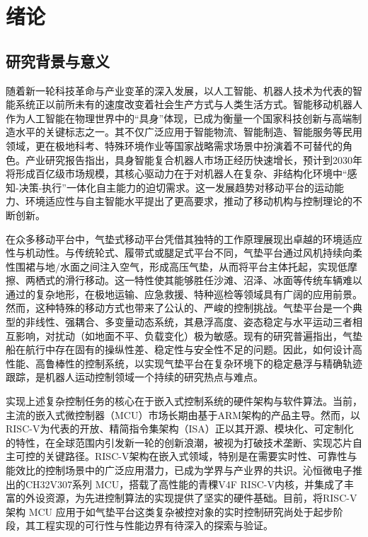 \section{绪论}

\subsection{研究背景与意义}

随着新一轮科技革命与产业变革的深入发展，以人工智能、机器人技术为代表的智能系统正以前所未有的速度改变着社会生产方式与人类生活方式。智能移动机器人作为人工智能在物理世界中的“具身”体现，已成为衡量一个国家科技创新与高端制造水平的关键标志之一。其不仅广泛应用于智能物流、智能制造、智能服务等民用领域，更在极地科考、特殊环境作业等国家战略需求场景中扮演着不可替代的角色。产业研究报告指出，具身智能复合机器人市场正经历快速增长，预计到2030年将形成百亿级市场规模，其核心驱动力在于对机器人在复杂、非结构化环境中“感知-决策-执行”一体化自主能力的迫切需求\cite{ref1}。这一发展趋势对移动平台的运动能力、环境适应性与自主智能水平提出了更高要求，推动了移动机构与控制理论的不断创新。

在众多移动平台中，气垫式移动平台凭借其独特的工作原理展现出卓越的环境适应性与机动性。与传统轮式、履带式或腿足式平台不同，气垫平台通过风机持续向柔性围裙与地/水面之间注入空气，形成高压气垫，从而将平台主体托起，实现低摩擦、两栖式的滑行移动。这一特性使其能够胜任沙滩、沼泽、冰面等传统车辆难以通过的复杂地形，在极地运输、应急救援、特种巡检等领域具有广阔的应用前景。然而，这种特殊的移动方式也带来了公认的、严峻的控制挑战。气垫平台是一个典型的非线性、强耦合、多变量动态系统，其悬浮高度、姿态稳定与水平运动三者相互影响，对扰动（如地面不平、负载变化）极为敏感。现有的研究普遍指出，气垫船在航行中存在固有的操纵性差、稳定性与安全性不足的问题。因此，如何设计高性能、高鲁棒性的控制系统，以实现气垫平台在复杂环境下的稳定悬浮与精确轨迹跟踪，是机器人运动控制领域一个持续的研究热点与难点\cite{ref2}。

实现上述复杂控制任务的核心在于嵌入式控制系统的硬件架构与软件算法。当前，主流的嵌入式微控制器（MCU）市场长期由基于ARM架构的产品主导。然而，以RISC-V为代表的开放、精简指令集架构（ISA）正以其开源、模块化、可定制化的特性，在全球范围内引发新一轮的创新浪潮，被视为打破技术垄断、实现芯片自主可控的关键路径\cite{ref3}。RISC-V架构在嵌入式领域，特别是在需要实时性、可靠性与能效比的控制场景中的广泛应用潜力，已成为学界与产业界的共识。沁恒微电子推出的CH32V307系列 MCU，搭载了高性能的青稞V4F RISC-V内核，并集成了丰富的外设资源，为先进控制算法的实现提供了坚实的硬件基础。目前，将RISC-V架构 MCU 应用于如气垫平台这类复杂被控对象的实时控制研究尚处于起步阶段，其工程实现的可行性与性能边界有待深入的探索与验证。

